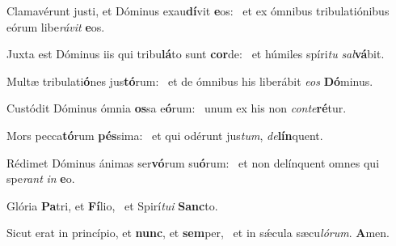 \item Clamavérunt justi, et Dóminus exau\textbf{dí}vit \textbf{e}os:~\psstar{} et ex ómnibus tribulatiónibus eórum libe\textit{rávit} \textbf{e}os.
\item Juxta est Dóminus iis qui tribu\textbf{lá}to sunt \textbf{cor}de:~\psstar{} et húmiles spíri\textit{tu} \textit{sal}\textbf{vá}bit.
\item Multæ tribulati\textbf{ó}nes jus\textbf{tó}\-rum:~\psstar{} et de ómnibus his liberábit \textit{eos} \textbf{Dó}minus.
\item Custódit Dóminus ómnia \textbf{os}sa e\textbf{ó}rum:~\psstar{} unum ex his non \textit{conte}\textbf{ré}tur.
\item Mors pecca\textbf{tó}rum \textbf{pés}sima:~\psstar{} et qui odérunt jus\textit{tum}, \textit{de}\textbf{lín}quent.
\item Rédimet Dóminus ánimas ser\textbf{vó}rum su\textbf{ó}rum:~\psstar{} et non delínquent omnes qui spe\textit{rant} \textit{in} \textbf{e}o.
\item Glória \textbf{Pa}tri, et \textbf{Fí}lio,~\psstar{} et Spirí\textit{tui} \textbf{Sanc}to.
\item Sicut erat in princípio, et \textbf{nunc}, et \textbf{sem}per,~\psstar{} et in sǽcula sæcu\textit{lórum}. \textbf{A}men.

